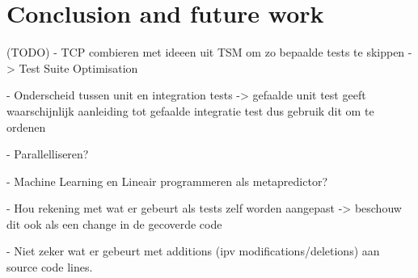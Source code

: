 \chapter{Conclusion and future work}

(TODO)
- TCP combieren met ideeen uit TSM om zo bepaalde tests te skippen -> Test Suite Optimisation

- Onderscheid tussen unit en integration tests -> gefaalde unit test geeft waarschijnlijk aanleiding tot gefaalde integratie test dus gebruik dit om te ordenen

- Parallelliseren?

- Machine Learning en Lineair programmeren als metapredictor?

- Hou rekening met wat er gebeurt als tests zelf worden aangepast -> beschouw dit ook als een change in de gecoverde code

- Niet zeker wat er gebeurt met additions (ipv modifications/deletions) aan source code lines.